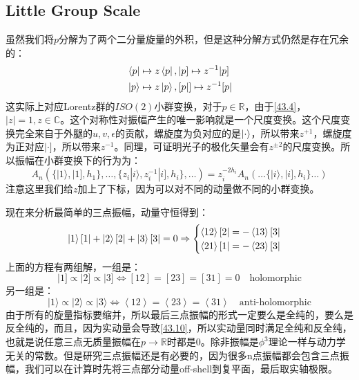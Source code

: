 \subsection{Little Group Scale}
虽然我们将$p$分解为了两个二分量旋量的外积，但是这种分解方式仍然是存在冗余的：
\begin{equation}
	\begin{aligned}
		&\bra{p}\mapsto z\bra{p},|p]\mapsto z^{-1}|p]\\
		&\ket{p}\mapsto z\ket{p},[p|]\mapsto z^{-1}[p|
	\end{aligned}
\end{equation}
这实际上对应Lorentz群的$ISO(2)$小群变换，对于$p\in\mathbb{R}$，由于\ref{43.4}，$|z|=1,z\in\mathbb{C}$。这个对称性对振幅产生的唯一影响就是一个尺度变换。这个尺度变换完全来自于外腿的$u,v,\epsilon$的贡献，螺旋度为负对应的是$\ket{\cdot}$，所以带来$z^{+1}$，螺旋度为正对应$|\cdot]$，所以带来$z^{-1}$。同理，可证明光子的极化矢量会有$z^{\pm2}$的尺度变换。所以振幅在小群变换下的行为为：
\begin{equation}
		\boxed{
			A_n\left(\{|1\rangle,|1],h_1\},\ldots,\{z_i|i\rangle,z_i^{-1}|i],h_i\},\ldots\right)=z_i^{-2h_i}A_n\left(\ldots\{|i\rangle,|i],h_i\}\ldots\right)
		}
\end{equation}
注意这里我们给$z$加上了下标，因为可以对不同的动量做不同的小群变换。

现在来分析最简单的三点振幅，动量守恒得到：
\begin{equation}
	\ket{1}[1|+\ket{2}[2|+\ket{3}[3|=0\Rightarrow\begin{cases}
		\left\langle 12\right\rangle [2|=-\left\langle 13\right\rangle [3|\\
		\left\langle 21\right\rangle [1|=-\left\langle 23\right\rangle [3|
	\end{cases}
\end{equation}
上面的方程有两组解，一组是：
\begin{equation}
	|1]\propto|2]\propto|3]\iff [12]=[23]=[31]=0\quad\text{holomorphic}
\end{equation}
另一组是：
\begin{equation}
	|1\rangle\propto|2\rangle\propto|3\rangle\iff \left\langle 12\right\rangle=\left\langle 23\right\rangle=\left\langle 31\right\rangle \quad\text{anti-holomorphic}
\end{equation}
由于所有的旋量指标要缩并，所以最后三点振幅的形式一定要么是全纯的，要么是反全纯的，而且，因为实动量会导致\ref{43.10}，所以实动量同时满足全纯和反全纯，也就是说任意三点无质量振幅在$p\to\mathbb{R}$时都是0。除非振幅是$\phi^3$理论一样与动力学无关的常数\sn{你还可以考虑$(-,+,-,+)$时空，这时虽然动量依旧是实数，但是$\bra{\cdot}$和$|\cdot]$无关了，所以这个时候三点振幅是non-trivial的}。但是研究三点振幅还是有必要的，因为很多n点振幅都会包含三点振幅，我们可以在计算时先将三点部分动量off-shell到复平面，最后取实轴极限。

